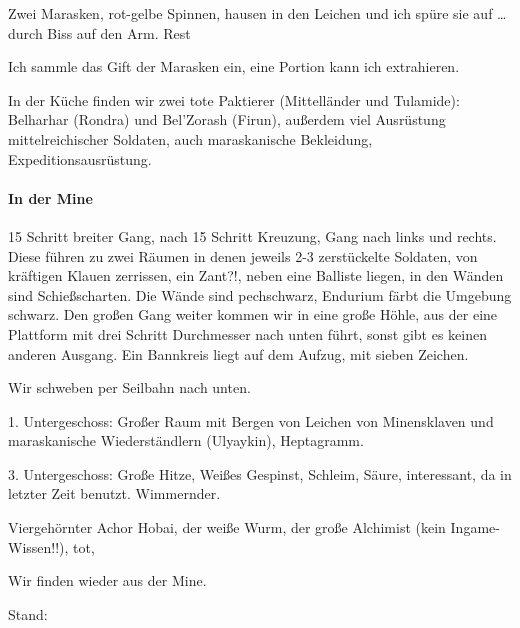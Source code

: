 Zwei Marasken, rot-gelbe Spinnen, hausen in den Leichen und ich spüre sie auf \dots {} durch Biss  auf den Arm. Rest 

Ich sammle das Gift der Marasken ein, eine Portion kann ich extrahieren. 

In der Küche finden wir zwei tote Paktierer (Mittelländer und Tulamide): Belharhar (Rondra) und Bel'Zorash (Firun), außerdem viel Ausrüstung mittelreichischer Soldaten, auch maraskanische Bekleidung, Expeditionsausrüstung. 

\paragraph{In der Mine}
\label{sec:der-mine}

15 Schritt breiter Gang, nach 15 Schritt Kreuzung, Gang nach links und rechts. Diese führen zu zwei Räumen in denen jeweils 2-3 zerstückelte Soldaten, von kräftigen Klauen zerrissen, ein Zant?!, neben eine Balliste liegen, in den Wänden sind Schießscharten. Die Wände sind pechschwarz, Endurium färbt die Umgebung schwarz. Den großen Gang weiter kommen wir in eine große Höhle, aus der eine Plattform mit drei Schritt Durchmesser nach unten führt, sonst gibt es keinen anderen Ausgang. Ein Bannkreis liegt auf dem Aufzug, mit sieben Zeichen.

Wir schweben per Seilbahn nach unten.
 
1. Untergeschoss: Großer Raum mit Bergen von Leichen von Minensklaven und maraskanische Wiederständlern (Ulyaykin), Heptagramm.

3. Untergeschoss: Große Hitze, Weißes Gespinst, Schleim, Säure, interessant, da in letzter Zeit benutzt. Wimmernder. 

Viergehörnter Achor Hobai, der weiße Wurm, der große Alchimist (kein Ingame-Wissen!!), tot,

Wir finden wieder aus der Mine.


Stand: 

